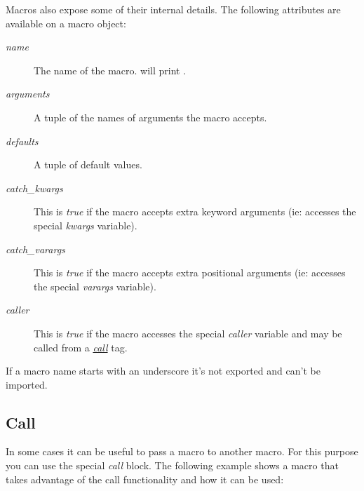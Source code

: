 \documentclass[a4paper,10pt,english]{sphinxmanual}
\begin{document}
Macros also expose some of their internal details.  The following attributes
are available on a macro object:
\begin{description}
\item[{\emph{name}}] \leavevmode
The name of the macro.   will print .

\item[{\emph{arguments}}] \leavevmode
A tuple of the names of arguments the macro accepts.

\item[{\emph{defaults}}] \leavevmode
A tuple of default values.

\item[{\emph{catch\_kwargs}}] \leavevmode
This is \emph{true} if the macro accepts extra keyword arguments (ie: accesses
the special \emph{kwargs} variable).

\item[{\emph{catch\_varargs}}] \leavevmode
This is \emph{true} if the macro accepts extra positional arguments (ie:
accesses the special \emph{varargs} variable).

\item[{\emph{caller}}] \leavevmode
This is \emph{true} if the macro accesses the special \emph{caller} variable and may
be called from a {\hyperref[templates:call]{\emph{call}}} tag.

\end{description}

If a macro name starts with an underscore it's not exported and can't
be imported.


\subsection{Call}
\label{templates:id6}\label{templates:call}
In some cases it can be useful to pass a macro to another macro.  For this
purpose you can use the special \emph{call} block.  The following example shows
a macro that takes advantage of the call functionality and how it can be
used:
\end{document}
